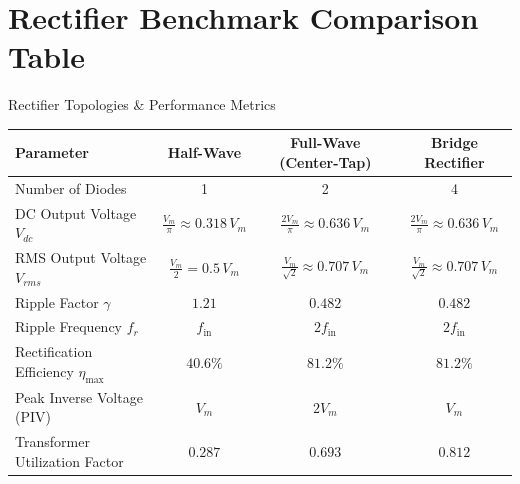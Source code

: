 \section{Rectifier Benchmark Comparison Table}
\begin{formulabox}{Rectifier Topologies \& Performance Metrics}
\begin{center}
\begin{tabular}{lccc}
\toprule
\textbf{Parameter} & \textbf{Half-Wave} & \textbf{Full-Wave (Center-Tap)} & \textbf{Bridge Rectifier} \\
\midrule
Number of Diodes & 1 & 2 & 4 \\
DC Output Voltage $V_{dc}$ & $\frac{V_m}{\pi} \approx 0.318\,V_m$ & $\frac{2 V_m}{\pi} \approx 0.636\,V_m$ & $\frac{2 V_m}{\pi} \approx 0.636\,V_m$ \\
RMS Output Voltage $V_{rms}$ & $\frac{V_m}{2} = 0.5\,V_m$ & $\frac{V_m}{\sqrt{2}} \approx 0.707\,V_m$ & $\frac{V_m}{\sqrt{2}} \approx 0.707\,V_m$ \\
Ripple Factor $\gamma$ & $1.21$ & $0.482$ & $0.482$ \\
Ripple Frequency $f_r$ & $f_{\mathrm{in}}$ & $2 f_{\mathrm{in}}$ & $2 f_{\mathrm{in}}$ \\
Rectification Efficiency $\eta_{\max}$ & $40.6\%$ & $81.2\%$ & $81.2\%$ \\
Peak Inverse Voltage (PIV) & $V_m$ & $2 V_m$ & $V_m$ \\
Transformer Utilization Factor & $0.287$ & $0.693$ & $0.812$ \\
\bottomrule
\end{tabular}
\end{center}
\end{formulabox}

